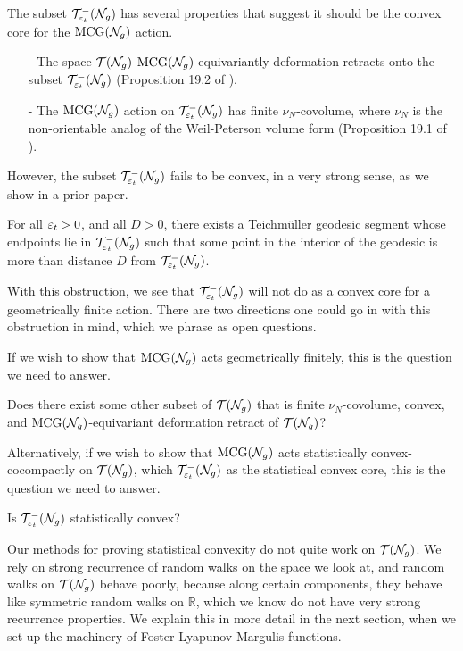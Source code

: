 \documentclass[12pt, reqno]{amsart}
\begin{document}
The subset $\mathcal{T}_{\varepsilon_t}^{-}(\mathcal{N}_g)$ has several properties that suggest it should be the convex core for the $\mathrm{MCG}(\mathcal{N}_g)$ action.
\begin{itemize}
\item[-] The space $\mathcal{T}(\mathcal{N}_g)$ $\mathrm{MCG}(\mathcal{N}_g)$-equivariantly deformation retracts onto the subset $\mathcal{T}_{\varepsilon_t}^{-}(\mathcal{N}_g)$ (Proposition 19.2 of \cite{gendulphe2017whats}).
\item[-] The $\mathrm{MCG}(\mathcal{N}_g)$ action on $\mathcal{T}_{\varepsilon_t}^{-}(\mathcal{N}_g)$ has finite $\nu_N$-covolume, where $\nu_N$ is the non-orientable analog of the Weil-Peterson volume form (Proposition 19.1 of \cite{gendulphe2017whats}).
\end{itemize}

However, the subset $\mathcal{T}_{\varepsilon_t}^{-}(\mathcal{N}_g)$ fails to be convex, in a very strong sense, as we show in a prior paper.
\begin{theorem}
  For all $\varepsilon_t > 0$, and all $D > 0$, there exists a Teichmüller geodesic segment whose endpoints lie in $\mathcal{T}_{\varepsilon_t}^{-}(\mathcal{N}_g)$ such that some point in the interior of the geodesic is more than distance $D$ from $\mathcal{T}_{\varepsilon_t}^{-}(\mathcal{N}_g)$.
\end{theorem}

With this obstruction, we see that $\mathcal{T}_{\varepsilon_t}^{-}(\mathcal{N}_g)$ will not do as a convex core for a geometrically finite action.
There are two directions one could go in with this obstruction in mind, which we phrase as open questions.

If we wish to show that $\mathrm{MCG}(\mathcal{N}_g)$ acts geometrically finitely, this is the question we need to answer.
\begin{question}
  Does there exist some other subset of $\mathcal{T}(\mathcal{N}_g)$ that is finite $\nu_N$-covolume, convex, and $\mathrm{MCG}(\mathcal{N}_g)$-equivariant deformation retract of $\mathcal{T}(\mathcal{N}_g)$?
\end{question}

Alternatively, if we wish to show that $\mathrm{MCG}(\mathcal{N}_g)$ acts statistically convex-cocompactly on $\mathcal{T}(\mathcal{N}_g)$, which $\mathcal{T}_{\varepsilon_t}^{-}(\mathcal{N}_g)$ as the statistical convex core, this is the question we need to answer.

\begin{question}
  Is $\mathcal{T}_{\varepsilon_t}^{-}(\mathcal{N}_g)$ statistically convex?
\end{question}

Our methods for proving statistical convexity do not quite work on $\mathcal{T}(\mathcal{N}_g)$.
We rely on strong recurrence of random walks on the space we look at, and random walks on $\mathcal{T}(\mathcal{N}_g)$ behave poorly, because along certain components, they behave like symmetric random walks on $\mathbb{R}$, which we know do not have very strong recurrence properties.
We explain this in more detail in the next section, when we set up the machinery of Foster-Lyapunov-Margulis functions.
\end{document}
